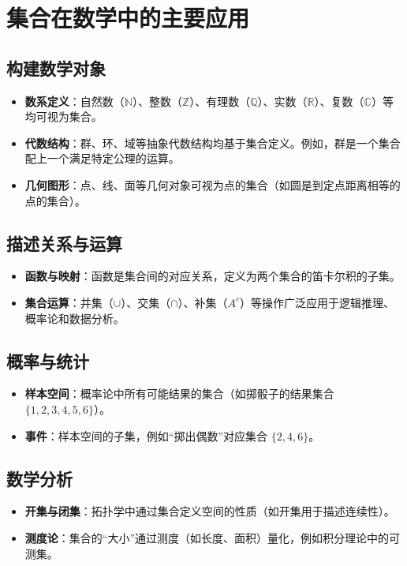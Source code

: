 \documentclass[a5paper]{article}
\begin{document}
\section{\textbf{集合在数学中的主要应用}}

\subsection*{构建数学对象}
\begin{itemize}
    \item \textbf{数系定义}：自然数（$\mathbb{N}$）、整数（$\mathbb{Z}$）、有理数（$\mathbb{Q}$）、实数（$\mathbb{R}$）、复数（$\mathbb{C}$）等均可视为集合。
    \item \textbf{代数结构}：群、环、域等抽象代数结构均基于集合定义。例如，群是一个集合配上一个满足特定公理的运算。
    \item \textbf{几何图形}：点、线、面等几何对象可视为点的集合（如圆是到定点距离相等的点的集合）。
\end{itemize}

\subsection*{描述关系与运算}
\begin{itemize}
    \item \textbf{函数与映射}：函数是集合间的对应关系，定义为两个集合的笛卡尔积的子集。
    \item \textbf{集合运算}：并集（$\cup$）、交集（$\cap$）、补集（$A^c$）等操作广泛应用于逻辑推理、概率论和数据分析。
\end{itemize}

\subsection*{概率与统计}
\begin{itemize}
    \item \textbf{样本空间}：概率论中所有可能结果的集合（如掷骰子的结果集合 $\{1,2,3,4,5,6\}$）。
    \item \textbf{事件}：样本空间的子集，例如“掷出偶数”对应集合 $\{2,4,6\}$。
\end{itemize}

\subsection*{数学分析}
\begin{itemize}
    \item \textbf{开集与闭集}：拓扑学中通过集合定义空间的性质（如开集用于描述连续性）。
    \item \textbf{测度论}：集合的“大小”通过测度（如长度、面积）量化，例如积分理论中的可测集。
\end{itemize}
\end{document}
